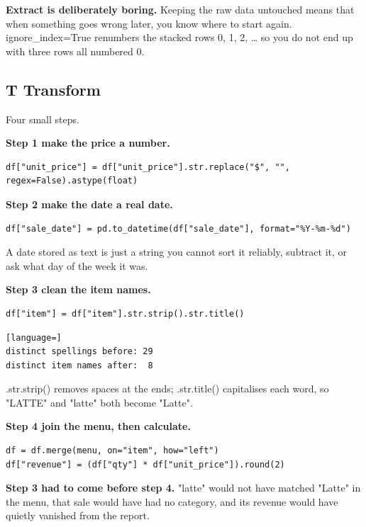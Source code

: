\documentclass[11pt,letterpaper]{article}
\newcommand{\py}[1]{{\ttfamily\small#1}}
\begin{document}
\begin{greenbox}[title={Remember}]
\small
\textbf{Extract is deliberately boring.} Keeping the raw data untouched means that when something goes
wrong later, you know where to start again. \py{ignore\_index=True} renumbers the stacked rows
0, 1, 2, \ldots{} so you do not end up with three rows all numbered 0.
\end{greenbox}

\subsection{T \textemdash{} Transform}

Four small steps.

\vspace{4pt}
\textbf{Step 1 \textemdash{} make the price a number.}
\begin{lstlisting}
df["unit_price"] = df["unit_price"].str.replace("$", "", regex=False).astype(float)
\end{lstlisting}

\textbf{Step 2 \textemdash{} make the date a real date.}
\begin{lstlisting}
df["sale_date"] = pd.to_datetime(df["sale_date"], format="%Y-%m-%d")
\end{lstlisting}

A date stored as text is just a string \textemdash{} you cannot sort it reliably, subtract it, or ask
what day of the week it was.

\textbf{Step 3 \textemdash{} clean the item names.}
\begin{lstlisting}
df["item"] = df["item"].str.strip().str.title()
\end{lstlisting}

\begin{lstlisting}[language=]
distinct spellings before: 29
distinct item names after:  8
\end{lstlisting}

\py{.str.strip()} removes spaces at the ends; \py{.str.title()} capitalises each word, so
\py{"LATTE"} and \py{"latte"} both become \py{"Latte"}.

\textbf{Step 4 \textemdash{} join the menu, then calculate.}
\begin{lstlisting}
df = df.merge(menu, on="item", how="left")
df["revenue"] = (df["qty"] * df["unit_price"]).round(2)
\end{lstlisting}

\begin{trap}
\small
\textbf{Step 3 had to come before step 4.} \py{"latte"} would not have matched \py{"Latte"} in the
menu, that sale would have had no category, and its revenue would have quietly vanished from the
report.
\end{trap}
\end{document}

